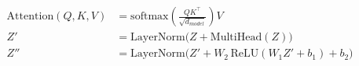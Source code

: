 \documentclass[12pt]{standalone}
\begin{document}
$\begin{aligned}
\mathrm{Attention}(Q,K,V) &= \mathrm{softmax}\!\left(\frac{QK^\top}{\sqrt{d_{model}}}\right) V\\[6pt]
Z' &= \mathrm{LayerNorm}\big(Z + \mathrm{MultiHead}(Z)\big)\\[2pt]
Z'' &= \mathrm{LayerNorm}\big(Z' + W_2\,\mathrm{ReLU}(W_1 Z' + b_1) + b_2\big)
\end{aligned}$
\end{document}
